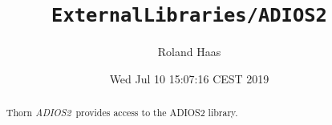 \documentclass{article}
\begin{document}
\title{\tt ExternalLibraries/ADIOS2}
\author{Roland Haas}
\date{ Wed Jul 10 15:07:16 CEST 2019 }

\maketitle


\ifx\ThisThorn\undefined
\newcommand{\ThisThorn}{{\it ADIOS2}}
\else
\renewcommand{\ThisThorn}{{\it ADIOS2}}
\fi

\begin{abstract}
Thorn \ThisThorn\ provides access to the ADIOS2 library.
\end{abstract}

\end{document}
